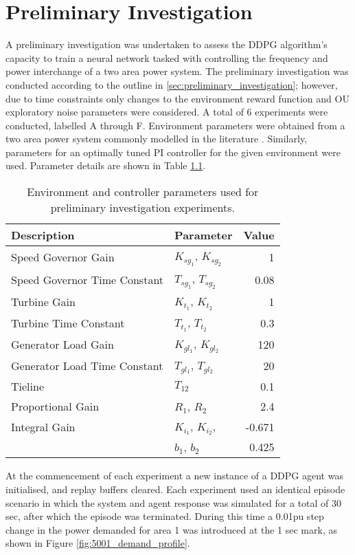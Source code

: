 \chapter{Preliminary Investigation}
A preliminary investigation was undertaken to assess the DDPG algorithm's capacity to train a neural network tasked with controlling the frequency and power interchange of a two area power system. The preliminary investigation was conducted according to the outline in \textsection \ref{sec:preliminary_investigation}; however, due to time constraints only changes to the environment reward function and OU exploratory noise parameters were considered. A total of 6 experiments were conducted, labelled A through F. Environment parameters were obtained from a two area power system commonly modelled in the literature \cite{}. Similarly, parameters for an optimally tuned PI controller for the given environment were used. Parameter details are shown in Table \ref{tab:5000}.
\begin{table}[h]
	\centering
	\caption{Environment and controller parameters used for preliminary investigation experiments.}
	\begin{tabular}{llr}
		\toprule
		\textbf{Description} & \textbf{Parameter} & \textbf{Value} \\
		\midrule
		Speed Governor Gain & $K_{sg_1}$, $K_{sg_2}$ & 1 \\
		Speed Governor Time Constant & $T_{sg_1}$, $T_{sg_2}$ & 0.08 \\
		Turbine Gain & $K_{t_1}$, $K_{t_2}$ & 1 \\
		Turbine Time Constant & $T_{t_1}$, $T_{t_2}$ & 0.3 \\
		Generator Load Gain & $K_{gl_1}$, $K_{gl_2}$ & 120 \\
		Generator Load Time Constant & $T_{gl_1}$, $T_{gl_2}$ & 20 \\
		Tieline & $T_{12}$ & 0.1 \\
		Proportional Gain & $R_1$, $R_2$ & 2.4 \\
		Integral Gain & $K_{i_1}$, $K_{i_2}$, & -0.671 \\
		 & $b_1$, $b_2$ & 0.425 \\
		\bottomrule
	\end{tabular}\label{tab:5000}
\end{table}

At the commencement of each experiment a new instance of a DDPG agent was initialised, and replay buffers cleared. Each experiment used an identical episode scenario in which the system and agent response was simulated for a total of 30 sec, after which the episode was terminated. During this time a 0.01pu step change in the power demanded for area 1 was introduced at the 1 sec mark, as shown in Figure \ref{fig:5001_demand_profile}.

